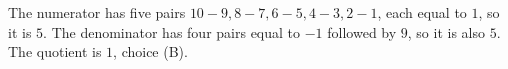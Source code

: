 The numerator has five pairs $10-9,8-7,6-5,4-3,2-1$, each equal to $1$, so it is $5$. The denominator has four pairs equal to $-1$ followed by $9$, so it is also $5$. The quotient is $\boxed1$, choice (B).
